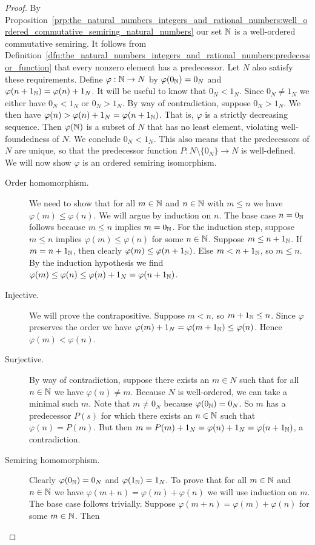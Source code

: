 \documentclass[../main.tex]{subfiles}
\begin{document}
\begin{proof}
    By Proposition~\ref{prp:the_natural_numbers_integers_and_rational_numbers:well_ordered_commutative_semiring_natural_numbers} our set $\mathbb{N}$ is a well-ordered commutative semiring. It follows from Definition~\ref{dfn:the_natural_numbers_integers_and_rational_numbers:predecessor_function} that every nonzero element has a predecessor. Let $N$ also satisfy these requirements. Define $\varphi:\mathbb{N}\to N$ by $\varphi(0_{\mathbb{N}})=0_N$ and $\varphi(n+1_{\mathbb{N}})=\varphi(n)+1_N$. It will be useful to know that $0_N<1_N$. Since $0_N\neq1_N$ we either have $0_N<1_N$ or $0_N>1_N$. By way of contradiction, suppose $0_N>1_N$. We then have $\varphi(n)>\varphi(n)+1_N=\varphi(n+1_{\mathbb{N}})$. That is, $\varphi$ is a strictly decreasing sequence. Then $\varphi(\mathbb{N})$ is a subset of $N$ that has no least element, violating well-foundedness of $N$. We conclude $0_N<1_N$. This also means that the predecessors of $N$ are unique, so that the predecessor function $P:N\setminus\{0_N\}\to N$ is well-defined. We will now show $\varphi$ is an ordered semiring isomorphism.
    \begin{description}
        \item[Order homomorphism.] We need to show that for all $m\in\mathbb{N}$ and $n\in\mathbb{N}$ with $m\leq n$ we have $\varphi(m)\leq\varphi(n)$. We will argue by induction on $n$. The base case $n=0_{\mathbb{N}}$ follows because $m\leq n$ implies $m=0_{\mathbb{N}}$. For the induction step, suppose $m\leq n$ implies $\varphi(m)\leq\varphi(n)$ for some $n\in\mathbb{N}$. Suppose $m\leq n+1_{\mathbb{N}}$. If $m=n+1_{\mathbb{N}}$, then clearly $\varphi(m)\leq\varphi(n+1_{\mathbb{N}})$. Else $m<n+1_{\mathbb{N}}$, so $m\leq n$. By the induction hypothesis we find $\varphi(m)\leq\varphi(n)\leq\varphi(n)+1_N=\varphi(n+1_{\mathbb{N}})$.
        \item[Injective.] We will prove the contrapositive. Suppose $m<n$, so $m+1_{\mathbb{N}}\leq n$. Since $\varphi$ preserves the order we have $\varphi(m)+1_N=\varphi(m+1_{\mathbb{N}})\leq\varphi(n)$. Hence $\varphi(m)<\varphi(n)$.
        \item[Surjective.] By way of contradiction, suppose there exists an $m\in N$ such that for all $n\in\mathbb{N}$ we have $\varphi(n)\neq m$. Because $N$ is well-ordered, we can take a minimal such $m$. Note that $m\neq0_N$ because $\varphi(0_{\mathbb{N}})=0_N$. So $m$ has a predecessor $P(s)$ for which there exists an $n\in\mathbb{N}$ such that $\varphi(n)=P(m)$. But then $m=P(m)+1_N=\varphi(n)+1_N=\varphi(n+1_{\mathbb{N}})$, a contradiction.
        \item[Semiring homomorphism.] Clearly $\varphi(0_{\mathbb{N}})=0_N$ and $\varphi(1_{\mathbb{N}})=1_N$. To prove that for all $m\in\mathbb{N}$ and $n\in\mathbb{N}$ we have $\varphi(m+n)=\varphi(m)+\varphi(n)$ we will use induction on $m$. The base case follows trivially. Suppose $\varphi(m+n)=\varphi(m)+\varphi(n)$ for some $m\in\mathbb{N}$. Then

\end{description}
\end{proof}
\end{document}
